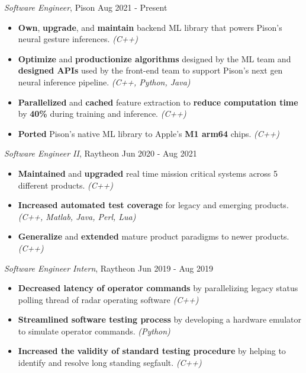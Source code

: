 \documentclass[a4paper,12pt]{memoir}
\begin{document}
\userinformation
\framebreak



\CVItem
	{\textit{Software Engineer}, Pison \hfill Aug 2021 - Present}
	{
		\begin{itemize}
			\item \textbf{Own}, \textbf{upgrade}, and \textbf{maintain} backend ML library that powers Pison's neural gesture inferences. \textit{(C++)}
			\item \textbf{Optimize} and \textbf{productionize algorithms} designed by the ML team and \textbf{designed APIs} used by the front-end team to support Pison's next gen neural inference pipeline. \textit{(C++, Python, Java)}
			\item \textbf{Parallelized} and \textbf{cached} feature extraction to \textbf{reduce computation time} by \textbf{40\%} during training and inference. \textit{(C++)}
			\item \textbf{Ported} Pison's native ML library to Apple's \textbf{M1 arm64} chips. \textit{(C++)}
		\end{itemize}
	}

\CVItem
	{\textit{Software Engineer II}, Raytheon \hfill Jun 2020 - Aug 2021}
	{
		\begin{itemize}
			\item \textbf{Maintained} and \textbf{upgraded} real time mission critical systems across 5 different products. \textit{(C++)}
			\item \textbf{Increased automated test coverage} for legacy and emerging products. \textit{(C++, Matlab, Java, Perl, Lua)}
			\item \textbf{Generalize} and \textbf{extended} mature product paradigms to newer products. \textit{(C++)}
		\end{itemize}
	}

\CVItem
	{\textit{Software Engineer Intern}, Raytheon \hfill Jun 2019 - Aug 2019}
	{
		\begin{itemize}
			\item \textbf{Decreased latency of operator commands} by parallelizing legacy status polling thread of radar operating software \textit{(C++)}
			\item \textbf{Streamlined software testing process} by developing a hardware emulator to simulate operator commands. \textit{(Python)}
			\item \textbf{Increased the validity of standard testing procedure} by helping to identify and resolve long standing segfault. \textit{(C++)}
		\end{itemize}
	}
\end{document}
